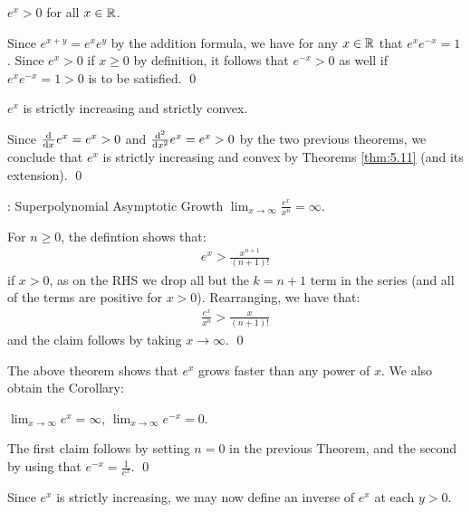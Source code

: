 \begin{ntheorem}{}{}
    $e^x > 0$ for all $x \in \mathbb{R}$.
\end{ntheorem}
\begin{nproof}
    Since $e^{x+y} = e^xe^y$ by the addition formula, we have for any $x \in \mathbb{R}$ that $e^{x}e^{-x} = 1$. Since $e^x > 0$ if $x \geq 0$ by definition, it follows that $e^{-x} > 0$ as well if $e^{x}e^{-x} = 1 > 0$ is to be satisfied. \qed
\end{nproof}

\begin{ntheorem}{}{}
    $e^x$ is strictly increasing and strictly convex.
\end{ntheorem}
\begin{nproof}
    Since $\od{}{x} e^x = e^x > 0$ and $\od[2]{}{x} e^x = e^x > 0$ by the two previous theorems, we conclude that $e^x$ is strictly increasing and convex by Theorems \ref{thm:5.11} (and its extension). \qed
\end{nproof}

\begin{ntheorem}{: Superpolynomial Asymptotic Growth}{}
    $\lim_{x \rightarrow \infty} \frac{e^x}{x^n} = \infty$.
\end{ntheorem}
\begin{nproof}
    For $n \geq 0$, the defintion shows that:
    \begin{align*}
        e^x > \frac{x^{n+1}}{(n+1)!}
    \end{align*}
    if $x > 0$, as on the RHS we drop all but the $k = n+1$ term in the series (and all of the terms are positive for $x > 0$). Rearranging, we have that:
    \begin{align*}
        \frac{e^x}{x^n} > \frac{x}{(n+1)!}
    \end{align*}
    and the claim follows by taking $x \rightarrow \infty$. \qed
\end{nproof}
\noindent The above theorem shows that $e^x$ grows faster than any power of $x$. We also obtain the Corollary:
\begin{ncorollary}{}{}
    $\lim_{x \rightarrow \infty} e^x = \infty$, $\lim_{x \rightarrow \infty} e^{-x} = 0$. 
\end{ncorollary}
\begin{nproof}
    The first claim follows by setting $n = 0$ in the previous Theorem, and the second by using that $e^{-x} = \frac{1}{e^x}$. \qed
\end{nproof}
\noindent Since $e^x$ is strictly increasing, we may now define an inverse of $e^x$ at each $y > 0$. 

